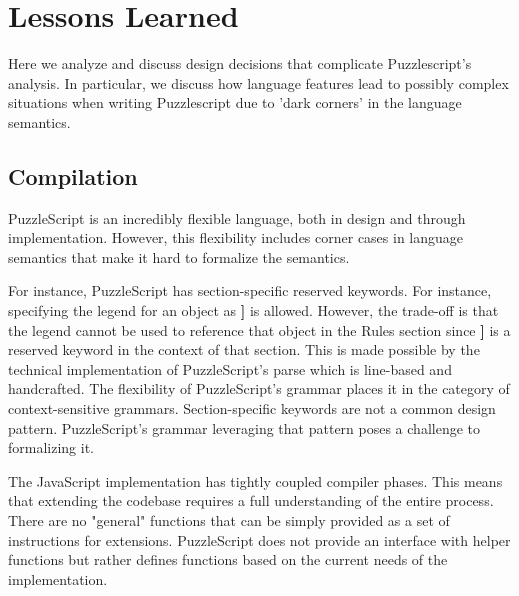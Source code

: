 \section{Lessons Learned}
Here we analyze and discuss design decisions that complicate Puzzlescript's analysis. In particular, we discuss how language features lead to possibly complex situations when writing Puzzlescript due to 'dark corners' in the language semantics.

\subsection{Compilation}
PuzzleScript is an incredibly flexible language, both in design and through implementation. However, this flexibility includes corner cases in language semantics that make it hard to formalize the semantics.

For instance, PuzzleScript has section-specific reserved keywords. For instance, specifying the legend for an object as \textbf{]} is allowed. However, the trade-off is that the legend cannot be used to reference that object in the Rules section since \textbf{]} is a reserved keyword in the context of that section. This is made possible by the technical implementation of PuzzleScript's parse which is line-based and handcrafted. The flexibility of PuzzleScript's grammar places it in the category of context-sensitive grammars. Section-specific keywords are not a common design pattern. PuzzleScript's grammar leveraging that pattern poses a challenge to formalizing it.



The JavaScript implementation has tightly coupled compiler phases. This means that extending the codebase requires a full understanding of the entire process. There are no "general" functions that can be simply provided as a set of instructions for extensions. PuzzleScript does not provide an interface with helper functions but rather defines functions based on the current needs of the implementation.

